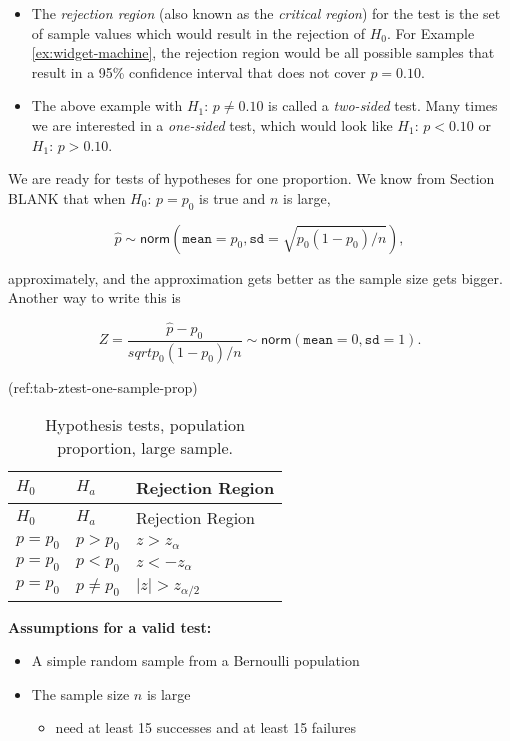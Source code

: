 \documentclass[]{book}
\providecommand{\tightlist}{%
  \setlength{\itemsep}{0pt}\setlength{\parskip}{0pt}}
\numberwithin{equation}{chapter}
\numberwithin{figure}{chapter}
\theoremstyle{plain}
\theoremstyle{definition}
\theoremstyle{remark}
\theoremstyle{definition}
\theoremstyle{definition}
\theoremstyle{remark}
\begin{document}
\begin{itemize}
\tightlist
\item
  The \emph{rejection region} (also known as the \emph{critical region})
  for the test is the set of sample values which would result in the
  rejection of \(H_{0}\). For Example \ref{ex:widget-machine}, the
  rejection region would be all possible samples that result in a 95\%
  confidence interval that does not cover \(p = 0.10\).
\item
  The above example with \(H_{1}:\,p \neq 0.10\) is called a
  \emph{two-sided} test. Many times we are interested in a
  \emph{one-sided} test, which would look like \(H_{1}:\,p < 0.10\) or
  \(H_{1}:\,p >  0.10\).
\end{itemize}

We are ready for tests of hypotheses for one proportion. We know from
Section BLANK that when \(H_{0}:\,p = p_{0}\) is true and \(n\) is
large,

\begin{equation}
\hat{p} \sim \mathsf{norm}(\mathtt{mean} = p_{0}, \mathtt{sd} = \sqrt{p_{0}(1 - p_{0})/n}),
\end{equation}

approximately, and the approximation gets better as the sample size gets
bigger. Another way to write this is

\begin{equation}
Z = \frac{\hat{p} - p_{0}}{sqrt{p_{0}(1 - p_{0})/n}}  \sim \mathsf{norm}(\mathtt{mean} = 0, \mathtt{sd} = 1).
\end{equation}

(ref:tab-ztest-one-sample-prop)

\begin{longtable}[]{@{}lll@{}}
\caption{Hypothesis tests, population proportion, large
sample.}\tabularnewline
\toprule
\(H_{0}\) & \(H_{a}\) & Rejection Region\tabularnewline
\midrule
\endfirsthead
\toprule
\(H_{0}\) & \(H_{a}\) & Rejection Region\tabularnewline
\midrule
\endhead
\(p = p_{0}\) & \(p > p_{0}\) & \(z > z_{\alpha}\)\tabularnewline
\(p = p_{0}\) & \(p < p_{0}\) & \(z < -z_{\alpha}\)\tabularnewline
\(p = p_{0}\) & \(p \neq p_{0}\) &
\(\vert z \vert > z_{\alpha/2}\)\tabularnewline
\bottomrule
\end{longtable}

\textbf{Assumptions for a valid test:}

\begin{itemize}
\tightlist
\item
  A simple random sample from a Bernoulli population
\item
  The sample size \(n\) is large

  \begin{itemize}
  \tightlist
  \item
    need at least 15 successes and at least 15 failures
  \end{itemize}
\end{itemize}
\end{document}
